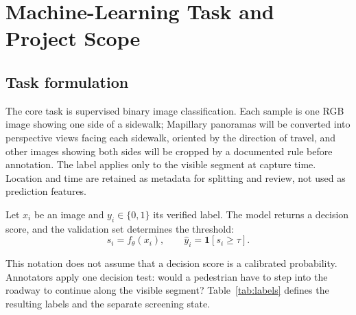 \section{Machine-Learning Task and Project Scope}

\subsection{Task formulation}

The core task is supervised binary image classification. Each sample is one RGB image showing one side of a sidewalk; Mapillary panoramas will be converted into perspective views facing each sidewalk, oriented by the direction of travel, and other images showing both sides will be cropped by a documented rule before annotation. The label applies only to the visible segment at capture time. Location and time are retained as metadata for splitting and review, not used as prediction features.

Let $x_i$ be an image and $y_i \in \{0,1\}$ its verified label. The model returns a decision score, and the validation set determines the threshold:
\begin{equation}
  s_i = f_\theta(x_i), \qquad \hat{y}_i = \mathbf{1}[s_i \ge \tau].
\end{equation}

This notation does not assume that a decision score is a calibrated probability. Annotators apply one decision test: would a pedestrian have to step into the roadway to continue along the visible segment? Table~\ref{tab:labels} defines the resulting labels and the separate screening state.

